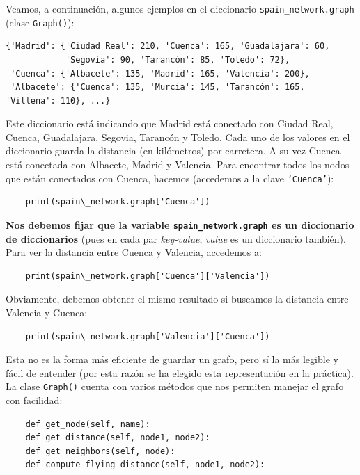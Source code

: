 \documentclass{article}
\begin{document}
Veamos, a continuación, algunos ejemplos en el diccionario \texttt{spain\_network.graph} (clase \texttt{Graph()}):
\begin{verbatim}
{'Madrid': {'Ciudad Real': 210, 'Cuenca': 165, 'Guadalajara': 60, 
            'Segovia': 90, 'Tarancón': 85, 'Toledo': 72},
 'Cuenca': {'Albacete': 135, 'Madrid': 165, 'Valencia': 200},
 'Albacete': {'Cuenca': 135, 'Murcia': 145, 'Tarancón': 165, 'Villena': 110}, ...}
\end{verbatim}

Este diccionario está indicando que Madrid está conectado con Ciudad Real, Cuenca, Guadalajara, Segovia, Tarancón y Toledo. Cada uno de los valores en el diccionario guarda la distancia (en kilómetros) por carretera. A su vez Cuenca está conectada con Albacete, Madrid y Valencia. Para encontrar todos los nodos que están conectados con Cuenca, hacemos (accedemos a la clave \texttt{'Cuenca'}):
\begin{verbatim}
    print(spain\_network.graph['Cuenca'])    
\end{verbatim}

\textbf{Nos debemos fijar que la variable \texttt{spain\_network.graph} es un diccionario de diccionarios} (pues en cada par \textit{key-value}, \textit{value} es un diccionario también). Para ver la distancia entre Cuenca y Valencia, accedemos a:
\begin{verbatim}
    print(spain\_network.graph['Cuenca']['Valencia']) 
\end{verbatim}

Obviamente, debemos obtener el mismo resultado si buscamos la distancia entre Valencia y Cuenca:
\begin{verbatim}
    print(spain\_network.graph['Valencia']['Cuenca']) 
\end{verbatim}

Esta no es la forma más eficiente de guardar un grafo, pero sí la más legible y fácil de entender (por esta razón se ha elegido esta representación en la práctica). La clase \texttt{Graph()} cuenta con varios métodos que nos permiten manejar el grafo con facilidad:
\begin{verbatim}
    def get_node(self, name):        
    def get_distance(self, node1, node2):
    def get_neighbors(self, node):    
    def compute_flying_distance(self, node1, node2):
\end{verbatim}

   
\end{document}
